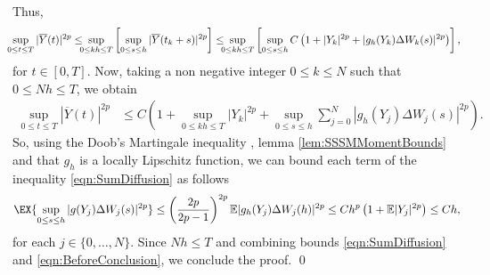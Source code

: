 \documentclass[sort&compress, preprint]{elsarticle}
\theoremstyle{definition}
\theoremstyle{plain}%
\theoremstyle{remark}
\newcommand{\m}[1]{\mathbb{E}#1}
\begin{document}
	Thus, 
	\begin{equation}
		\hspace{-0.2cm}\sup_{0\leq t\leq T} |\overline{Y}(t)|^{2p}
		\leq
			\hspace{-0.2cm}\sup_{0\leq kh\leq T}
			\left[
				\sup_{0\leq s\leq h}
					|\overline{Y}(t_k+s)|^{2p} 
			\right] 
		\leq
			\hspace{-0.2cm}\sup_{0\leq kh\leq T} 
			\left[
				\sup_{0\leq s\leq h}
					C 
					\left(
						1 + |Y_k|^{2p} + |g_h(Y_k)\Delta W_k(s)|^{2p}
					\right)
			\right],
		\label{eqn:BeforeDoob}
	\end{equation}
	for $t\in [0,T]$.
	Now, taking a non negative integer $0 \leq k \leq N$ such that $0\leq Nh \leq T$, we obtain
	\begin{align}
		\sup_{0\leq t\leq T} |\overline{Y}(t)|^{2p}
		&\leq 
			C
			\left(
				1
				+
				\sup_{0\leq kh\leq T} 
					|Y_k|^{2p}
					+
					\sup_{0\leq s\leq h}
						\sum_{j=0}^N
							|g_h(Y_j)\Delta W_j(s)|^{2p}
			\right) \label{eqn:SumDiffusion}.
	\end{align}
	So, using the Doob's Martingale inequality  \cite{Mao2007}, lemma
	\ref{lem:SSSMMomentBounds} and that $g_h$ is a locally 
	Lipschitz function, we can bound each term of the inequality \eqref{eqn:SumDiffusion}
	as follows
	\begin{align}
		\EX{
			\sup_{0 \leq s \leq h} |g(Y_j) \Delta W_j(s)|^{2p}
		}
		\leq
			\left(
				\frac{2p}{2p-1}
			\right)^{2p}
			\m|g_h(Y_j)\Delta W_j(h)|^{2p}
		\leq
			C h^p
			\left(
				1 + \m|Y_j|^{2p}
			\right)
		 \leq C h, \label{eqn:BeforeConclusion}
	\end{align}
	for each $j \in \{0,\dots, N\}$.
	Since $Nh\leq T$ and combining bounds \eqref{eqn:SumDiffusion} 
	and \eqref{eqn:BeforeConclusion}, we conclude the proof. \qed
\end{document}
